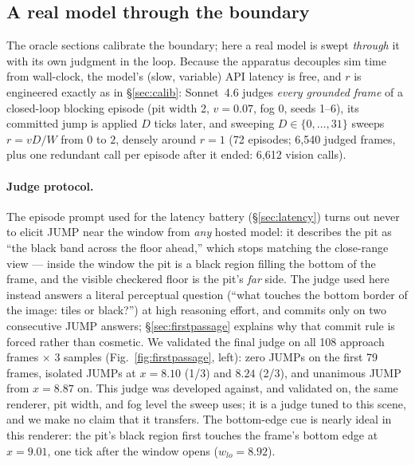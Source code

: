 \documentclass[11pt]{article}
\begin{document}
\subsection{A real model through the boundary}\label{sec:real}

The oracle sections calibrate the boundary; here a real model is swept
\emph{through} it with its own judgment in the loop. Because the apparatus
decouples sim time from wall-clock, the model's (slow, variable) API latency is
free, and $r$ is engineered exactly as in \S\ref{sec:calib}: Sonnet~4.6 judges
\emph{every grounded frame} of a closed-loop blocking episode (pit width 2,
$v = 0.07$, fog 0, seeds 1--6), its committed jump is applied $D$ ticks later,
and sweeping $D \in \{0, \dots, 31\}$ sweeps $r = vD/W$ from $0$ to $2$,
densely around $r = 1$ (72 episodes; 6{,}540 judged frames, plus one redundant
call per episode after it ended: 6{,}612 vision calls).

\paragraph{Judge protocol.} The episode prompt used for the latency battery
(\S\ref{sec:latency}) turns out never to elicit JUMP near the window from
\emph{any} hosted model: it describes the pit as ``the black band across the
floor ahead,'' which stops matching the close-range view --- inside the window
the pit is a black region filling the bottom of the frame, and the visible
checkered floor is the pit's \emph{far} side. The judge used here instead
answers a literal perceptual question (``what touches the bottom border of the
image: tiles or black?'') at high reasoning effort, and commits only on two
consecutive JUMP answers; \S\ref{sec:firstpassage} explains why that commit
rule is forced rather than cosmetic. We validated the final judge on all 108
approach frames $\times$ 3 samples (Fig.~\ref{fig:firstpassage}, left): zero
JUMPs on the first 79 frames, isolated JUMPs at $x = 8.10$ (1/3) and $8.24$
(2/3), and unanimous JUMP from $x = 8.87$ on. This judge was developed against,
and validated on, the same renderer, pit width, and fog level the sweep uses;
it is a judge tuned to this scene, and we make no claim that it transfers. The
bottom-edge cue is nearly ideal in this renderer: the pit's black region first
touches the frame's bottom edge at $x = 9.01$, one tick after the window opens
($w_{lo} = 8.92$).
\end{document}
